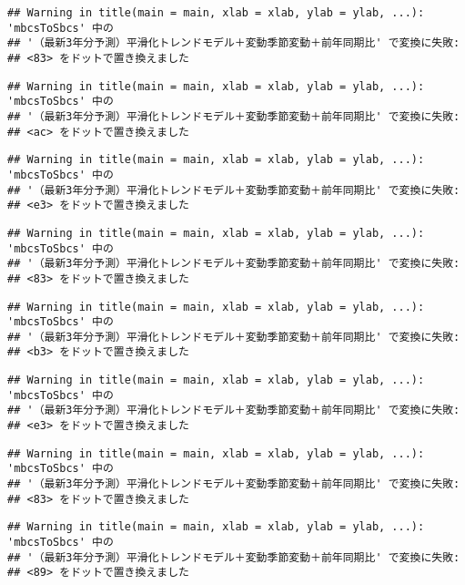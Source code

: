 \documentclass[]{article}
\begin{document}
\begin{verbatim}
## Warning in title(main = main, xlab = xlab, ylab = ylab, ...): 'mbcsToSbcs' 中の
## '（最新3年分予測）平滑化トレンドモデル＋変動季節変動＋前年同期比' で変換に失敗:
## <83> をドットで置き換えました
\end{verbatim}

\begin{verbatim}
## Warning in title(main = main, xlab = xlab, ylab = ylab, ...): 'mbcsToSbcs' 中の
## '（最新3年分予測）平滑化トレンドモデル＋変動季節変動＋前年同期比' で変換に失敗:
## <ac> をドットで置き換えました
\end{verbatim}

\begin{verbatim}
## Warning in title(main = main, xlab = xlab, ylab = ylab, ...): 'mbcsToSbcs' 中の
## '（最新3年分予測）平滑化トレンドモデル＋変動季節変動＋前年同期比' で変換に失敗:
## <e3> をドットで置き換えました
\end{verbatim}

\begin{verbatim}
## Warning in title(main = main, xlab = xlab, ylab = ylab, ...): 'mbcsToSbcs' 中の
## '（最新3年分予測）平滑化トレンドモデル＋変動季節変動＋前年同期比' で変換に失敗:
## <83> をドットで置き換えました
\end{verbatim}

\begin{verbatim}
## Warning in title(main = main, xlab = xlab, ylab = ylab, ...): 'mbcsToSbcs' 中の
## '（最新3年分予測）平滑化トレンドモデル＋変動季節変動＋前年同期比' で変換に失敗:
## <b3> をドットで置き換えました
\end{verbatim}

\begin{verbatim}
## Warning in title(main = main, xlab = xlab, ylab = ylab, ...): 'mbcsToSbcs' 中の
## '（最新3年分予測）平滑化トレンドモデル＋変動季節変動＋前年同期比' で変換に失敗:
## <e3> をドットで置き換えました
\end{verbatim}

\begin{verbatim}
## Warning in title(main = main, xlab = xlab, ylab = ylab, ...): 'mbcsToSbcs' 中の
## '（最新3年分予測）平滑化トレンドモデル＋変動季節変動＋前年同期比' で変換に失敗:
## <83> をドットで置き換えました
\end{verbatim}

\begin{verbatim}
## Warning in title(main = main, xlab = xlab, ylab = ylab, ...): 'mbcsToSbcs' 中の
## '（最新3年分予測）平滑化トレンドモデル＋変動季節変動＋前年同期比' で変換に失敗:
## <89> をドットで置き換えました
\end{verbatim}
\end{document}
